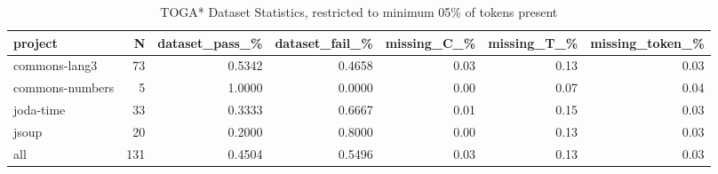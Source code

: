 \begin{table*}
\centering
\caption{TOGA* Dataset Statistics, restricted to minimum 05\% of tokens present}
\label{tab:toga_stats_05}
\begin{tabular}{lrrrrrr}
\toprule
         project &    N &  dataset\_pass\_\% &  dataset\_fail\_\% &  missing\_C\_\% &  missing\_T\_\% &  missing\_token\_\% \\
\midrule
   commons-lang3 &   73 &          0.5342 &          0.4658 &         0.03 &         0.13 &             0.03 \\
 commons-numbers &    5 &          1.0000 &          0.0000 &         0.00 &         0.07 &             0.04 \\
       joda-time &   33 &          0.3333 &          0.6667 &         0.01 &         0.15 &             0.03 \\
           jsoup &   20 &          0.2000 &          0.8000 &         0.00 &         0.13 &             0.03 \\
             all &  131 &          0.4504 &          0.5496 &         0.03 &         0.13 &             0.03 \\
\bottomrule
\end{tabular}
\end{table*}
